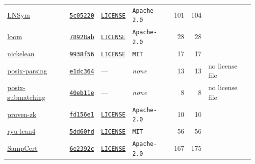 \documentclass{article}
\begin{document}
\begin{table}[p]
\begin{tabular}{lllp{2.9cm}rrl}
    \href{https://github.com/leanprover/LNSym}{LNSym} & \href{https://github.com/leanprover/LNSym/tree/5c05220ff970e3bdd7813ad0c9ef3741522c8b92}{\texttt{5c05220}} & \href{https://github.com/leanprover/LNSym/blob/5c05220ff970e3bdd7813ad0c9ef3741522c8b92/LICENSE}{\texttt{LICENSE}} & \texttt{Apache-2.0} & 101 & 104 &  \\
    \href{https://github.com/verse-lab/loom}{loom} & \href{https://github.com/verse-lab/loom/tree/78928abc9054b31d0bea85985496490baae95244}{\texttt{78928ab}} & \href{https://github.com/verse-lab/loom/blob/78928abc9054b31d0bea85985496490baae95244/LICENSE}{\texttt{LICENSE}} & \texttt{Apache-2.0} & 28 & 28 &  \\
    \href{https://github.com/lexicone42/nickelean}{nickelean} & \href{https://github.com/lexicone42/nickelean/tree/9938f56b642143ad18af83b8851a7a1b04f50a91}{\texttt{9938f56}} & \href{https://github.com/lexicone42/nickelean/blob/9938f56b642143ad18af83b8851a7a1b04f50a91/LICENSE}{\texttt{LICENSE}} & \texttt{MIT} & 17 & 17 &  \\
    \href{https://github.com/keeganperry7/posix-parsing}{posix-parsing} & \href{https://github.com/keeganperry7/posix-parsing/tree/e1dc3644c5f8c6601fe5d578c8edd4c9b28a6d1a}{\texttt{e1dc364}} & --- & \emph{none} & 13 & 13 & no license file \\
    \href{https://github.com/keeganperry7/posix-submatching}{posix-submatching} & \href{https://github.com/keeganperry7/posix-submatching/tree/40eb11ec00990a6e73f8947b85f0c61d98074bb2}{\texttt{40eb11e}} & --- & \emph{none} & 8 & 8 & no license file \\
    \href{https://github.com/reilabs/proven-zk}{proven-zk} & \href{https://github.com/reilabs/proven-zk/tree/fd156e1a0a0771271b7871972f428b0c93b5b56e}{\texttt{fd156e1}} & \href{https://github.com/reilabs/proven-zk/blob/fd156e1a0a0771271b7871972f428b0c93b5b56e/LICENSE}{\texttt{LICENSE}} & \texttt{Apache-2.0} & 10 & 10 &  \\
    \href{https://github.com/lexicone42/ryu-lean4}{ryu-lean4} & \href{https://github.com/lexicone42/ryu-lean4/tree/5dd60fd7a0f08822a6efa0f97e585ce8efa270d4}{\texttt{5dd60fd}} & \href{https://github.com/lexicone42/ryu-lean4/blob/5dd60fd7a0f08822a6efa0f97e585ce8efa270d4/LICENSE}{\texttt{LICENSE}} & \texttt{MIT} & 56 & 56 &  \\
    \href{https://github.com/leanprover/SampCert}{SampCert} & \href{https://github.com/leanprover/SampCert/tree/6e2392c165652063fefc628d8f047b77ca393b0f}{\texttt{6e2392c}} & \href{https://github.com/leanprover/SampCert/blob/6e2392c165652063fefc628d8f047b77ca393b0f/LICENSE}{\texttt{LICENSE}} & \texttt{Apache-2.0} & 167 & 175 &  \\

\end{tabular}
\end{table}
\end{document}
